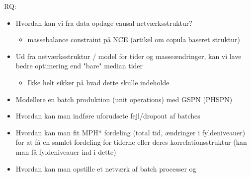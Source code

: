 \documentclass[../Thesis.tex]{subfiles}
\begin{document}
RQ:
\begin{itemize}
    \item Hvordan kan vi fra data opdage causal netværksstruktur?
          \begin{itemize}
              \item massebalance constraint på NCE (artikel om copula baseret struktur)
          \end{itemize}
    \item Ud fra netværksstruktur / model for tider og masseændringer, kan vi lave bedre optimering end "bare" median tider
          \begin{itemize}
              \item Ikke helt sikker på hvad dette skulle indeholde
          \end{itemize}
    \item Modellere en batch produktion (unit operations) med GSPN (PHSPN)
    \item Hvordan kan man indføre uforudsete fejl/dropout af batches
    \item Hvordan kan man fit MPH* fordeling (total tid, ændringer i fyldeniveauer) for at få en samlet fordeling for tiderne eller deres korrelationsstruktur (kan man få fyldeniveauer ind i dette)
    \item Hvordan kan man opstille et netværk af batch processer og
\end{itemize}









\end{document}
